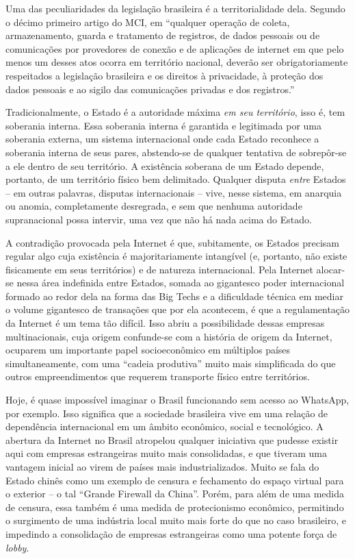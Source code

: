 Uma das peculiaridades da legislação brasileira é a territorialidade dela.
Segundo o décimo primeiro artigo do MCI, em ``qualquer operação de coleta, armazenamento, guarda e tratamento de registros, de dados pessoais ou de comunicações por provedores de conexão e de aplicações de internet em que pelo menos um desses atos ocorra em território nacional, deverão ser obrigatoriamente respeitados a legislação brasileira e os direitos à privacidade, à proteção dos dados pessoais e ao sigilo das comunicações privadas e dos registros.''

Tradicionalmente, o Estado é a autoridade máxima \textit{em seu território}, isso é, tem soberania interna.
Essa soberania interna é garantida e legitimada por uma soberania externa, um sistema internacional onde cada Estado reconhece a soberania interna de seus pares, abstendo-se de qualquer tentativa de sobrepôr-se a ele dentro de seu território.
A existência soberana de um Estado depende, portanto, de um território físico bem delimitado.
Qualquer disputa \textit{entre} Estados -- em outras palavras, disputas internacionais -- vive, nesse sistema, em anarquia ou anomia, completamente desregrada, e sem que nenhuma autoridade supranacional possa intervir, uma vez que não há nada acima do Estado. \cite{araujo_estado_2021}

A contradição provocada pela Internet é que, subitamente, os Estados precisam regular algo cuja existência é majoritariamente intangível (e, portanto, não existe fisicamente em seus territórios) e de natureza internacional.
Pela Internet alocar-se nessa área indefinida entre Estados, somada ao gigantesco poder internacional formado ao redor dela na forma das Big Techs e a dificuldade técnica em mediar o volume gigantesco de transações que por ela acontecem, é que a regulamentação da Internet é um tema tão difícil.
Isso abriu a possibilidade dessas empresas multinacionais, cuja origem confunde-se com a história de origem da Internet, ocuparem um importante papel socioeconômico em múltiplos países simultaneamente, com uma ``cadeia produtiva'' muito mais simplificada do que outros empreendimentos que requerem transporte físico entre territórios.

Hoje, é quase impossível imaginar o Brasil funcionando sem acesso ao WhatsApp, por exemplo.
Isso significa que a sociedade brasileira vive em uma relação de dependência internacional em um âmbito econômico, social e tecnológico.
A abertura da Internet no Brasil atropelou qualquer iniciativa que pudesse existir aqui com empresas estrangeiras muito mais consolidadas, e que tiveram uma vantagem inicial ao virem de países mais industrializados.
Muito se fala do Estado chinês como um exemplo de censura e fechamento do espaço virtual para o exterior -- o tal ``Grande Firewall da China''.
Porém, para além de uma medida de censura, essa também é uma medida de protecionismo econômico, permitindo o surgimento de uma indústria local muito mais forte do que no caso brasileiro, e impedindo a consolidação de empresas estrangeiras como uma potente força de \textit{lobby}.

